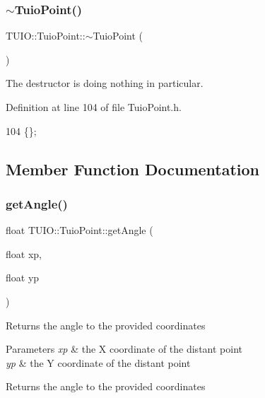 \subsubsection{\texorpdfstring{$\sim$\+Tuio\+Point()}{~TuioPoint()}}
{\footnotesize\ttfamily T\+U\+I\+O\+::\+Tuio\+Point\+::$\sim$\+Tuio\+Point (\begin{DoxyParamCaption}{ }\end{DoxyParamCaption})\hspace{0.3cm}{\ttfamily [inline]}}

The destructor is doing nothing in particular. 

Definition at line 104 of file Tuio\+Point.\+h.


\begin{DoxyCode}
104 \{\};
\end{DoxyCode}


\subsection{Member Function Documentation}
\mbox{\label{class_t_u_i_o_1_1_tuio_point_ad4ca45ad0fdccc6f55b5af79189e7872}} 
\subsubsection{\texorpdfstring{get\+Angle()}{getAngle()}\hspace{0.1cm}{\footnotesize\ttfamily [1/2]}}
{\footnotesize\ttfamily float T\+U\+I\+O\+::\+Tuio\+Point\+::get\+Angle (\begin{DoxyParamCaption}\item[{float}]{xp,  }\item[{float}]{yp }\end{DoxyParamCaption})\hspace{0.3cm}{\ttfamily [inline]}}

Returns the angle to the provided coordinates


\begin{DoxyParams}{Parameters}
{\em xp} & the X coordinate of the distant point \\
\hline
{\em yp} & the Y coordinate of the distant point \\
\hline
\end{DoxyParams}
\begin{DoxyReturn}{Returns}
the angle to the provided coordinates 
\end{DoxyReturn}


